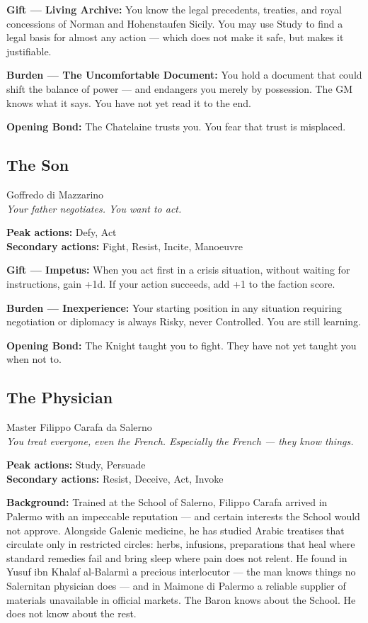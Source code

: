 \textbf{Gift --- Living Archive:} You know the legal precedents,
treaties, and royal concessions of Norman and Hohenstaufen Sicily.
You may use Study to find a legal basis for almost any action —
which does not make it safe, but makes it justifiable.

\textbf{Burden --- The Uncomfortable Document:} You hold a document
that could shift the balance of power — and endangers you merely by
possession. The GM knows what it says. You have not yet read it to
the end.

\textbf{Opening Bond:} The Chatelaine trusts you.
You fear that trust is misplaced.

\filetto

\subsection{The Son}
{\cinzel\footnotesize\color{grigionote} Goffredo di Mazzarino}\\
\textit{Your father negotiates. You want to act.}

\textbf{Peak actions:} Defy, Act\\
\textbf{Secondary actions:} Fight, Resist, Incite, Manoeuvre

\textbf{Gift --- Impetus:} When you act first in a crisis situation,
without waiting for instructions, gain +1d. If your action succeeds,
add +1 to the faction score.

\textbf{Burden --- Inexperience:} Your starting position in any
situation requiring negotiation or diplomacy is always Risky, never
Controlled. You are still learning.

\textbf{Opening Bond:} The Knight taught you to fight.
They have not yet taught you when not to.

\filetto

\subsection{The Physician}
{\cinzel\footnotesize\color{grigionote} Master Filippo Carafa da Salerno}\\
\textit{You treat everyone, even the French. Especially the French — they know things.}

\textbf{Peak actions:} Study, Persuade\\
\textbf{Secondary actions:} Resist, Deceive, Act, Invoke

\textbf{Background:} Trained at the School of Salerno, Filippo Carafa
arrived in Palermo with an impeccable reputation — and certain interests
the School would not approve. Alongside Galenic medicine, he has studied
Arabic treatises that circulate only in restricted circles: herbs,
infusions, preparations that heal where standard remedies fail and bring
sleep where pain does not relent. He found in Yusuf ibn Khalaf al-Balarmì
a precious interlocutor — the man knows things no Salernitan physician
does — and in Maimone di Palermo a reliable supplier of materials
unavailable in official markets. The Baron knows about the School.
He does not know about the rest.

